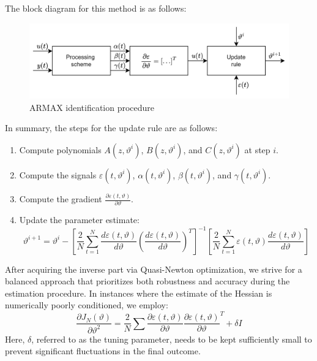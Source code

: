 The block diagram for this method is as follows:
\begin{figure}[H]
    \centering
    \includegraphics[width=0.75\linewidth]{images/iden.png}
    \caption{ARMAX identification procedure}
\end{figure}

In summary, the steps for the update rule are as follows:
\begin{enumerate}
    \item Compute polynomials $A(z,\vartheta^i)$, $B(z,\vartheta^i)$, and $C(z,\vartheta^i)$ at step $i$. 
    \item Compute the signals $\varepsilon(t, \vartheta^i)$, $\alpha(t, \vartheta^i)$, $\beta(t, \vartheta^i)$, and $\gamma(t, \vartheta^i)$. 
    \item Compute the gradient $\frac{\partial\varepsilon(t,\vartheta)}{\partial\vartheta}$.
    \item Update the parameter estimate: 
        \[\vartheta^{i+1}=\vartheta^i-\left[ \dfrac{2}{N}\sum_{t=1}^{N}\dfrac{d\varepsilon(t,\vartheta)}{d\vartheta}\left(\dfrac{d\varepsilon(t,\vartheta)}{d\vartheta}\right)^T \right]^{-1}\left[\dfrac{2}{N}\sum_{t=1}^{N}\varepsilon(t,\vartheta)\dfrac{d\varepsilon(t,\vartheta)}{d\vartheta}\right]\]
\end{enumerate}

After acquiring the inverse part via Quasi-Newton optimization, we strive for a balanced approach that prioritizes both robustness and accuracy during the estimation procedure. 
In instances where the estimate of the Hessian is numerically poorly conditioned, we employ:
\[\dfrac{\partial J_N(\vartheta)}{\partial\vartheta^2}=\dfrac{2}{N}\sum\dfrac{\partial\varepsilon(t,\vartheta)}{\partial\vartheta}\dfrac{\partial\varepsilon(t,\vartheta)}{\partial\vartheta}^T+\delta I\]
Here, $\delta$, referred to as the tuning parameter, needs to be kept sufficiently small to prevent significant fluctuations in the final outcome.